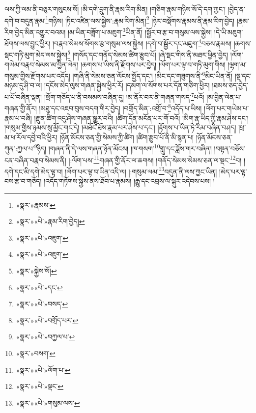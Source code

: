 ལས་ཀྱི་ལམ་ནི་བཅུར་གསུངས་སོ། །མི་དགེ་དྲུག་ནི་རྣམ་རིག་མིན། །གཅིག་རྣམ་གཉིས་སོ་དེ་དག་ཀྱང་། །བྱེད་ན་དགེ་བ་བདུན་རྣམ་\footnote{«སྣར་»རྣམས་}གཉིས། །ཏིང་འཛིན་ལས་སྐྱེས་:རྣམ་རིག་མིན།\footnote{«སྣར་»«པེ་»རྣམ་རིག་བྱེད།} །ཉེར་བསྡོགས་རྣམས་ནི་རྣམ་རིག་བྱེད། །རྣམ་རིག་བྱེད་མིན་འགྱུར་བའམ། །མ་ཡིན་བཟློག་པ་མཇུག་\footnote{«སྣར་»«པེ་»འཇུག་}ཡིན་ནོ། །སྦྱོར་བ་རྩ་བ་གསུམ་ལས་སྐྱེས། །དེ་ཡི་མཇུག་ཐོགས་ལས་བྱུང་ཕྱིར། །བརྣབ་སེམས་སོགས་རྩ་གསུམ་ལས་སྐྱེས། །དགེ་བ་སྦྱོར་དང་མཇུག་\footnote{«སྣར་»«པེ་»འཇུག་}བཅས་རྣམས། །ཆགས་སྡང་གཏི་མུག་མེད་ལས་སྐྱེས།\footnote{«སྣར་»སྐྱེས་སོ།} །གསོད་དང་གནོད་སེམས་ཚིག་རྩུབ་པོ། །ཞེ་སྡང་གིས་ནི་མཐར་ཕྱིན་བྱེད། །ལོག་གཡེམ་བརྣབ་སེམས་མ་བྱིན་ལེན། །ཆགས་པ་ཡིས་ནི་རྫོགས་པར་བྱེད། །ལོག་པར་ལྟ་བ་གཏི་མུག་གིས། །ལྷག་མ་གསུམ་གྱིས་རྫོགས་པར་འདོད། །གཞི་ནི་སེམས་ཅན་ལོངས་སྤྱོད་དང་། །མིང་དང་གཟུགས་ནི་\footnote{«སྣར་»«པེ་»དང་}མིང་ཡིན་ནོ། །སྔ་དང་མཉམ་དུ་ཤི་བ་ལ། །དངོས་མེད་ལུས་གཞན་སྐྱེས་ཕྱིར་རོ། །དམག་ལ་སོགས་པར་དོན་གཅིག་ཕྱིར། །ཐམས་ཅད་བྱེད་པ་པོ་བཞིན་ལྡན། །སྲོག་གཅོད་པ་ནི་བསམས་བཞིན་དུ། །མ་ནོར་བར་ནི་གཞན་གསད་\footnote{«སྣར་»«པེ་»བསད་}པའོ། །མ་བྱིན་ལེན་པ་གཞན་གྱི་ནོར། །མཐུ་དང་འཇབ་བུས་བདག་གིར་བྱེད། །བགྲོད་མིན་:འགྲོ་བ་\footnote{«སྣར་»«པེ་»བགྲོད་པར་}འདོད་པ་ཡིས། །ལོག་པར་གཡེམ་པ་རྣམ་པ་བཞི། །རྫུན་ཚིག་འདུ་ཤེས་གཞན་སྒྱུར་བའི། །ཚིག་དོན་མངོན་པར་གོ་བའོ། །མིག་རྣ་ཡིད་ཀྱི་རྣམ་ཤེས་དང་། །གསུམ་གྱིས་ཉམས་སུ་མྱོང་གང་དེ། །མཐོང་ཐོས་རྣམ་པར་ཤེས་པ་དང་། །རྟོགས་པ་ཡིན་ཏེ་རིམ་བཞིན་བཤད། །ཕྲ་མ་ཕ་རོལ་དབྱེ་བའི་ཕྱིར། །ཉོན་མོངས་ཅན་གྱི་སེམས་ཀྱི་ཚིག །ཚིག་རྩུབ་པོ་ནི་མི་སྙན་པ། །ཉོན་མོངས་ཅན་ཀུན་:ཀྱལ་པ་\footnote{«སྣར་»«པེ་»བཀྱལ་པ་}ཉིད། །གཞན་ནི་དེ་ལས་གཞན་ཉོན་མོངས། །ཁ་གསག་\footnote{«སྣར་»བསག་}གླུ་དང་ཟློས་གར་བཞིན། །བསྟན་བཅོས་ངན་བཞིན་བརྣབ་སེམས་ནི། །:ལོག་པས་\footnote{«སྣར་»«པེ་»ལོག་པ་}གཞན་གྱི་ནོར་ལ་ཆགས། །གནོད་སེམས་སེམས་ཅན་ལ་སྡང་\footnote{«སྣར་»«པེ་»ལྡང་}བ། །དགེ་དང་མི་དགེ་མེད་ལྟ་བ། །ལོག་པར་ལྟ་བ་ཡིན་འདི་ལ། །:གསུམ་ལམ་\footnote{«སྣར་»«པེ་»གསུམ་ལས་}བདུན་ནི་ལས་ཀྱང་ཡིན། །མེད་པར་ལྟ་བས་རྩ་བ་གཅོད། །འདོད་གཏོགས་སྐྱེས་ནས་ཐོབ་པ་རྣམས། །རྒྱུ་དང་འབྲས་ལ་སྐུར་འདེབས་པས། །
